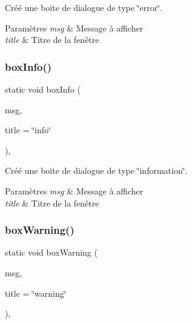 Créé une boite de dialogue de type \char`\"{}error\char`\"{}. 


\begin{DoxyParams}{Paramètres}
{\em msg} & Message à afficher \\
\hline
{\em title} & Titre de la fenêtre \\
\hline
\end{DoxyParams}
\mbox{\label{classutils_aed917b49e1356903b63626302d9adcc2}} 
\subsubsection{\texorpdfstring{box\+Info()}{boxInfo()}}
{\footnotesize\ttfamily static void box\+Info (\begin{DoxyParamCaption}\item[{Q\+String}]{msg,  }\item[{Q\+String}]{title = {\ttfamily \char`\"{}info\char`\"{}} }\end{DoxyParamCaption})\hspace{0.3cm}{\ttfamily [inline]}, {\ttfamily [static]}}



Créé une boite de dialogue de type \char`\"{}information\char`\"{}. 


\begin{DoxyParams}{Paramètres}
{\em msg} & Message à afficher \\
\hline
{\em title} & Titre de la fenêtre \\
\hline
\end{DoxyParams}
\mbox{\label{classutils_a0621bcdcce14a9175584c8937abb55f4}} 
\subsubsection{\texorpdfstring{box\+Warning()}{boxWarning()}}
{\footnotesize\ttfamily static void box\+Warning (\begin{DoxyParamCaption}\item[{Q\+String}]{msg,  }\item[{Q\+String}]{title = {\ttfamily \char`\"{}warning\char`\"{}} }\end{DoxyParamCaption})\hspace{0.3cm}{\ttfamily [inline]}, {\ttfamily [static]}}



